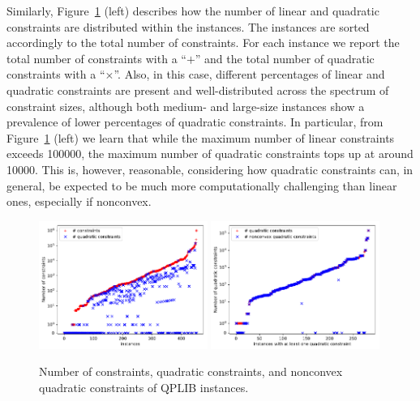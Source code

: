 Similarly, Figure~\ref{fig:pic_constr} (left)
describes how the number of linear and quadratic
constraints are distributed within the instances. The instances are sorted
accordingly to the total number of constraints.
For each instance we report the total number of constraints with a ``$+$''
and the total number of quadratic constraints
with a ``$\times$''. Also, in this case, different percentages of linear and
quadratic constraints are present and well-distributed across the spectrum
of constraint sizes, although both medium- and large-size instances show a
prevalence of lower percentages of quadratic constraints. In particular,
from Figure~\ref{fig:pic_constr} (left) we learn that while the maximum number
of linear constraints exceeds 100000, the maximum number of quadratic
constraints tops up at around 10000. This is, however, reasonable, considering
how quadratic constraints can, in general, be expected to be much more
computationally challenging than linear ones, especially if nonconvex.

\begin{figure}\centering
  \includegraphics[width=0.49\textwidth]{pic_constr.pdf}
  \includegraphics[width=0.49\textwidth]{pic_quad_conv_vs_nonconv.pdf}
  \caption{Number of constraints, quadratic constraints, and nonconvex quadratic constraints of QPLIB instances. \label{fig:pic_constr}}
\end{figure}

